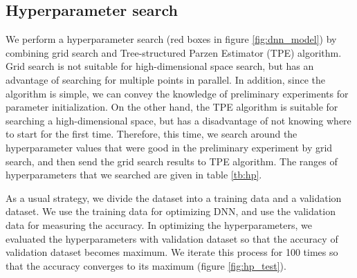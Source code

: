 \documentclass[useamsfonts]{pasj01}
\begin{document}
\subsection{Hyperparameter search}\label{hyperparametersearch}
We perform a hyperparameter search (red boxes in figure \ref{fig:dnn_model}) by combining grid search and Tree-structured Parzen Estimator (TPE) algorithm.
Grid search is not suitable for high-dimensional space search, but has an advantage of searching for multiple points in parallel.
In addition, since the algorithm is simple, we can convey the knowledge of preliminary experiments for parameter initialization.
On the other hand, the TPE algorithm is suitable for searching a high-dimensional space, but has a disadvantage of not knowing where to start for the first time.
Therefore, this time, we search around the hyperparameter values that were good in the preliminary experiment by grid search, and then send the grid search results to TPE algorithm.  
The ranges of hyperparameters that we searched are given in table \ref{tb:hp}.

As a usual strategy, we divide the dataset into a training data and a validation dataset.
We use the training data for optimizing DNN, and use the validation data for measuring the accuracy.
In optimizing the hyperparameters, we evaluated the hyperparameters with validation dataset so
that the accuracy of validation dataset becomes maximum.
We iterate this process for 100 times so that the accuracy converges to its maximum (figure \ref{fig:hp_test}).

%
\begin{table}[htbp]
  \label{tb:hp}
\end{table}
\end{document}
